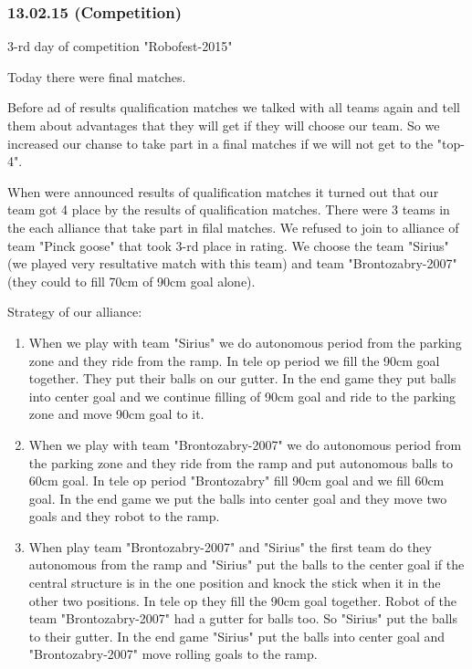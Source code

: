 \subsubsection{13.02.15 (Competition)}
\begin{center}
	3-rd day of competition "Robofest-2015"
\end{center}
Today there were final matches.\newline

Before ad of results qualification matches we talked with all teams again and tell them about advantages that they will get if they will choose our team. So we increased our chanse to take part in a final matches if we will not get to the "top-4".\newline

When were announced results of qualification matches it turned out that our team got 4 place by the results of qualification matches. There were 3 teams in the each alliance that take part in filal matches. We refused to join to alliance of team "Pinck goose" that took 3-rd place in rating. We choose the team "Sirius"(we played very resultative match with this team) and team "Brontozabry-2007" (they could to fill 70cm of 90cm goal alone).\newline

Strategy of our alliance:
\begin{enumerate}
	\item When we play with team "Sirius" we do autonomous period from the parking zone and they ride from the ramp. In tele op period we fill the 90cm goal together. They put their balls on our gutter. In the end game they put balls into center goal and we continue filling of 90cm goal and ride to the parking zone and move 90cm goal to it.
	
	\item When we play with team "Brontozabry-2007" we do autonomous period from the parking zone and they ride from the ramp and put autonomous balls to 60cm goal. In tele op period "Brontozabry" fill 90cm goal and we fill 60cm goal. In the end game we put the balls into center goal and they move two goals and they robot to the ramp.
	
	\item When play team "Brontozabry-2007" and "Sirius" the first team do they autonomous from the ramp and "Sirius" put the balls to the center goal if the central structure is in the one position and knock the stick when it in the other two positions. In tele op they fill the 90cm goal together. Robot of the team "Brontozabry-2007" had a gutter for balls too. So "Sirius" put the balls to their gutter. In the end game "Sirius" put the balls into center goal and "Brontozabry-2007" move rolling goals to the ramp. 
\end{enumerate}


